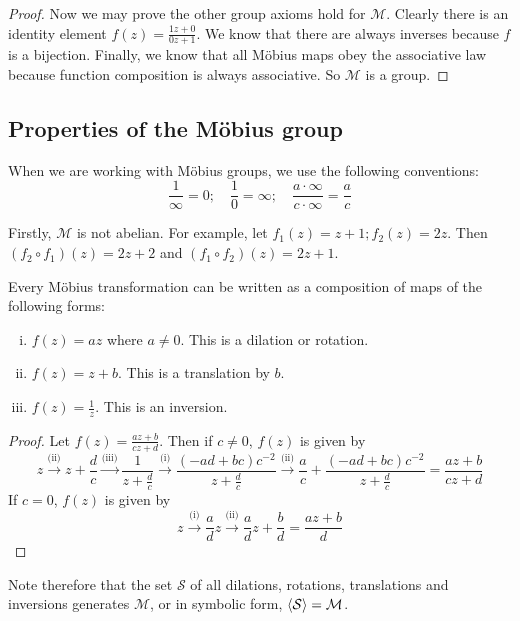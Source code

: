 \begin{proof}
	Now we may prove the other group axioms hold for \(\mathcal M\).
	Clearly there is an identity element \(f(z) = \frac{1z + 0}{0z + 1}\).
	We know that there are always inverses because \(f\) is a bijection.
	Finally, we know that all M\"obius maps obey the associative law because function composition is always associative.
	So \(\mathcal M\) is a group.
\end{proof}

\subsection{Properties of the M\"obius group}
When we are working with M\"obius groups, we use the following conventions:
\[
	\frac{1}{\infty} = 0;\quad \frac{1}{0} = \infty;\quad \frac{a\cdot\infty}{c\cdot\infty} = \frac{a}{c}
\]

Firstly, \(\mathcal M\) is not abelian.
For example, let \(f_1(z) = z + 1; f_2(z) = 2z\).
Then \((f_2 \circ f_1)(z) = 2z + 2\) and \((f_1 \circ f_2)(z) = 2z + 1\).

\begin{proposition}
	Every M\"obius transformation can be written as a composition of maps of the following forms:
	\begin{enumerate}[(i)]
		\item \(f(z) = az\) where \(a\neq 0\).
		      This is a dilation or rotation.
		\item \(f(z) = z + b\).
		      This is a translation by \(b\).
		\item \(f(z) = \frac{1}{z}\).
		      This is an inversion.
	\end{enumerate}
\end{proposition}
\begin{proof}
	Let \(f(z) = \frac{az + b}{cz + d}\).
	Then if \(c \neq 0\), \(f(z)\) is given by
	\[
		z \xrightarrow{\text{(ii)}} z + \frac{d}{c} \xrightarrow{\text{(iii)}} \frac{1}{z + \frac{d}{c}} \xrightarrow{\text{(i)}} \frac{(-ad+bc)c^{-2}}{z + \frac{d}{c}} \xrightarrow{\text{(ii)}} \frac{a}{c} + \frac{(-ad+bc)c^{-2}}{z + \frac{d}{c}} = \frac{az + b}{cz + d}
	\]
	If \(c = 0\), \(f(z)\) is given by
	\[
		z \xrightarrow{\text{(i)}} \frac{a}{d}z \xrightarrow{\text{(ii)}} \frac{a}{d}z + \frac{b}{d} = \frac{az + b}{d}
	\]
\end{proof}
Note therefore that the set \(\mathcal S\) of all dilations, rotations, translations and inversions generates \(\mathcal M\), or in symbolic form, \(\langle{} \mathcal S \rangle = \mathcal M\).
